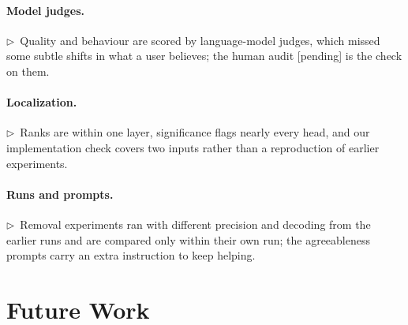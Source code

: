 \documentclass[11pt]{article}
\newcommand{\flow}[1]{\par\noindent\textcolor{blue!60!black}{\small$\triangleright$\ #1}\par\medskip}
\begin{document}
\paragraph{Model judges.}
\flow{Quality and behaviour are scored by language-model judges, which missed some subtle shifts in what a user believes; the human audit [pending] is the check on them.}

\paragraph{Localization.}
\flow{Ranks are within one layer, significance flags nearly every head, and our implementation check covers two inputs rather than a reproduction of earlier experiments.}

\paragraph{Runs and prompts.}
\flow{Removal experiments ran with different precision and decoding from the earlier runs and are compared only within their own run; the agreeableness prompts carry an extra instruction to keep helping.}

\section{Future Work}
\end{document}
